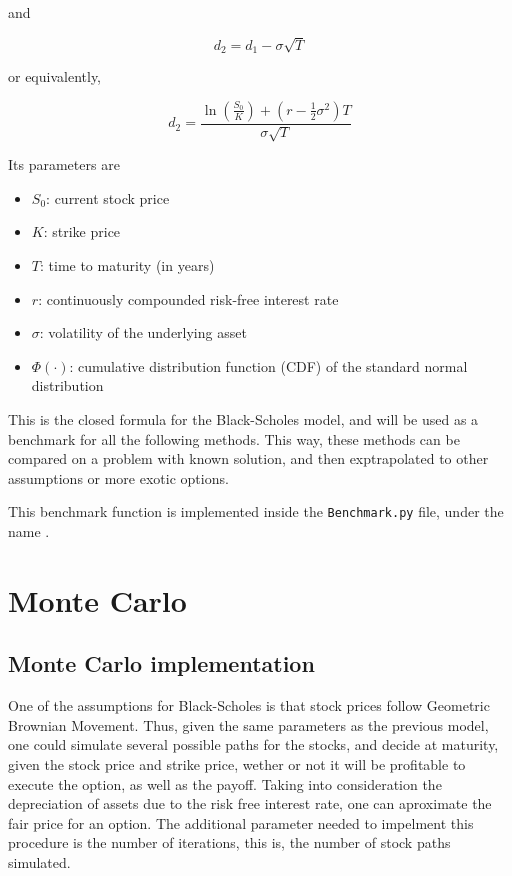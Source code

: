 \documentclass[11pt,oneside,parskip=half]{scrbook}  %
\begin{document}
and

$$
d_2 = d_1 - \sigma \sqrt{T}
$$

or equivalently,

$$
d_2 =\frac{ \ln\left(\frac{S_0}{K}\right) + \left(r - \frac{1}{2}\sigma^2\right)T }{ \sigma \sqrt{T} }
$$

Its parameters are

\begin{itemize}
\item{$S_0$: current stock price}
\item{$K$: strike price}
\item{$T$: time to maturity (in years)}
\item{$r$: continuously compounded risk-free interest rate}
\item{$\sigma$: volatility of the underlying asset}
\item{$\Phi(\cdot)$: cumulative distribution function (CDF) of the standard normal distribution}
\end{itemize}

This is the closed formula for the Black-Scholes model, and will be used as a benchmark for all the following methods. This way, these methods can be compared on a problem with known solution, and then exptrapolated to other assumptions or more exotic options.

This benchmark function is implemented inside the \texttt{Benchmark.py} file, under the name .

\chapter{Monte Carlo}
\section{Monte Carlo implementation}

One of the assumptions for Black-Scholes is that stock prices follow Geometric Brownian Movement. Thus, given the same parameters as the previous model, one could simulate several possible paths for the stocks, and decide at maturity, given the stock price and strike price, wether or not it will be profitable to execute the option, as well as the payoff. Taking into consideration the depreciation of assets due to the risk free interest rate, one can aproximate the fair price for an option. The additional parameter needed to impelment this procedure is the number of iterations, this is, the number of stock paths simulated.
\end{document}
